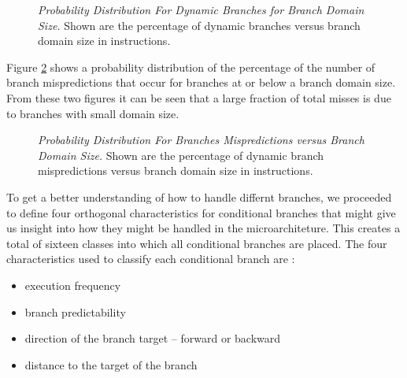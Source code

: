 \documentclass[10pt,dvips]{article}
\begin{document}
\begin{figure}
\vspace{0.2 in}
\setlength{\epsfxsize}{10cm}%
\centerline{}
\caption{{\em Probability Distribution For Dynamic Branches for 
Branch Domain Size.} 
Shown are the percentage of dynamic branches versus branch domain size
in instructions.}
\label{fig:numbranches}
\end{figure}

Figure \ref{fig:mispredictions} shows a probability distribution of
the percentage of the number of branch mispredictions that
occur for branches at or below a branch domain size.
From these two figures it can be seen 
that a large fraction of total misses is due to branches with small domain
size. 

\begin{figure}
\vspace{0.2 in}
\setlength{\epsfxsize}{10cm}%
\centerline{}
\caption{{\em Probability Distribution For Branches Mispredictions
versus
Branch Domain Size.} 
Shown are the percentage of dynamic branch mispredictions versus 
branch domain size
in instructions.}
\label{fig:mispredictions}
\end{figure}

To get a better understanding of how to handle differnt branches,
we proceeded to define four orthogonal characteristics
for conditional branches that might give us insight into
how they might be handled in the microarchiteture.
This creates a total of sixteen classes into which all conditional 
branches are placed.
The four characteristics used to classify each conditional branch are :

\begin{itemize}
\item{execution frequency}
\item{branch predictability}
\item{direction of the branch target -- forward or backward}
\item{distance to the target of the branch}
\end{itemize}   
\end{document}

